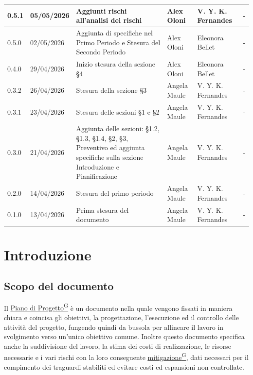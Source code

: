 \documentclass[a4paper,12pt]{article}
\providecommand{\glslink}[2]{\href{https://alittlebyte-19.github.io/Documentazione/glossario.html\#gls-#1}{\underline{#2}\textsuperscript{\scriptsize G}}}
\begin{document}
\begin{longtable}{|l|l|p{4.5cm}|p{2cm}|p{2.5cm}|p{2.5cm}|}
    0.5.1 & 05/05/2026 & Aggiunti rischi all'analisi dei rischi & Alex Oloni & V. Y. K. Fernandes & - \\ \hline
    0.5.0 & 02/05/2026 & Aggiunta di specifiche nel Primo Periodo e Stesura del Secondo Periodo & Alex Oloni & Eleonora Bellet & - \\ \hline
    0.4.0 & 29/04/2026 & Inizio stesura della sezione §4 & Alex Oloni & Eleonora Bellet & - \\ \hline
    0.3.2 & 26/04/2026 & Stesura della sezione §3 & Angela Maule & V. Y. K. Fernandes & - \\ \hline
    0.3.1 & 23/04/2026 & Stesura delle sezioni §1 e §2 & Angela Maule & V. Y. K. Fernandes & - \\ \hline
    0.3.0 & 21/04/2026 & Aggiunta delle sezioni: §1.2, §1.3, §1.4, §2, §3, Preventivo ed aggiunta specifiche sulla sezione Introduzione e Pianificazione & Angela Maule & V. Y. K. Fernandes & - \\ \hline
    0.2.0 & 14/04/2026 & Stesura del primo periodo & Angela Maule & V. Y. K. Fernandes & - \\ \hline
    0.1.0 & 13/04/2026 & Prima stesura del documento & Angela Maule & V. Y. K. Fernandes & - \\ \hline

\end{longtable}

\newpage
{}
\setcounter{page}{1}
\newpage

\tableofcontents
\listoftables
\listoffigures

\newpage

\section{Introduzione}
\label{sec:introduzione}

\subsection{Scopo del documento}
\label{sec:scopo_del_documento}
Il \glslink{piano-di-progetto}{Piano di Progetto} è un documento nella quale vengono fissati in maniera chiara e coincisa gli obiettivi, la progettazione, l'esecuzione ed il controllo delle attività del progetto, fungendo quindi da bussola per allineare il lavoro in svolgimento verso un'unico obiettivo comune.
Inoltre questo documento specifica anche la suddivisione del lavoro, la stima dei costi di realizzazione, le risorse necessarie e i vari rischi con la loro conseguente \glslink{mitigazione-dei-rischi}{mitigazione}, dati necessari per il compimento dei traguardi stabiliti ed evitare costi ed espansioni non controllate.
\end{document}
